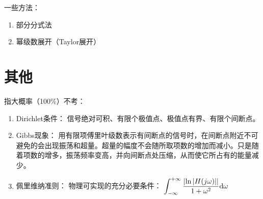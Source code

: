 \documentclass{article}
\begin{document}
\begin{thm}[拉普拉斯反变换]
    一些方法：
	\begin{enumerate}
		\item 部分分式法
		\item 幂级数展开（Taylor展开）
	\end{enumerate}
\end{thm}


\newpage
\section{其他}
\begin{thm}[陶冶情操]指大概率（100\%）不考：\\
	\begin{enumerate}
		\item 
			Dirichlet条件：
			信号绝对可积、有限个极值点、极值点有界、有限个间断点。\\
		\item
			Gibbs现象：
			用有限项傅里叶级数表示有间断点的信号时，在间断点附近不可避免的会出现振荡和超量。超量的幅度不会随所取项数的增加而减小。只是随着项数的增多，振荡频率变高，并向间断点处压缩，从而使它所占有的能量减少。
		\item 
			佩里维纳准则：
			物理可实现的充分必要条件：
			$\displaystyle
			\int_{-\infty}^{+\infty}
			\frac{\abs{\ln\abs{H(j\omega)}}}{1+\omega^2}
			\dd \omega
			$
	\end{enumerate}
    
	
\end{thm}
\end{document}
